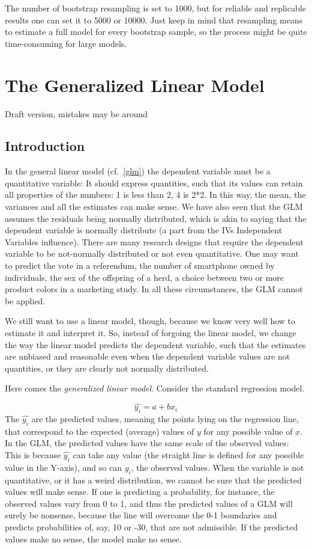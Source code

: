 \documentclass[
]{book}
\begin{document}
The number of bootstrap resampling is set to 1000, but for reliable and replicable results one can set it to 5000 or 10000. Just keep in mind that resampling means to estimate a full model for every bootstrap sample, so the process might be quite time-consuming for large models.

\hypertarget{gzlm}{%
\chapter{The Generalized Linear Model}\label{gzlm}}

{ Draft version, mistakes may be around }

\hypertarget{gzlmintro}{%
\section{Introduction}\label{gzlmintro}}

In the general linear model (cf.~\ref{glm}) the dependent variable must be a quantitative variable: It should express quantities, such that its values can retain all properties of the numbers: 1 is less than 2, 4 is 2*2. In this way, the mean, the variances and all the estimates can make sense. We have also seen that the GLM assumes the residuals being normally distributed, which is akin to saying that the dependent variable is normally distribute (a part from the {IVs {Independent Variables} } influence). There are many research designs that require the dependent variable to be not-normally distributed or not even quantitative. One may want to predict the vote in a referendum, the number of smartphone owned by individuals, the sex of the offspring of a herd, a choice between two or more product colors in a marketing study. In all these circumstances, the GLM cannot be applied.

We still want to use a linear model, though, because we know very well how to estimate it and interpret it. So, instead of forgoing the linear model, we change the way the linear model predicts the dependent variable, such that the estimates are unbiased and reasonable even when the dependent variable values are not quantities, or they are clearly not normally distributed.

Here comes the \emph{generalized linear model}. Consider the standard regression model.

\[
\hat{y_i}=a+b x_i
\]
The \(\hat{y_i}\) are the predicted values, meaning the points lying on the regression line, that correspond to the expected (average) values of \(y\) for any possible value of \(x\). In the GLM, the predicted values have the same scale of the observed values: This is because \(\hat{y_i}\) can take any value (the straight line is defined for any possible value in the Y-axis), and so can \(y_i\), the observed values. When the variable is not quantitative, or it has a weird distribution, we cannot be sure that the predicted values will make sense. If one is predicting a probability, for instance, the observed values vary from 0 to 1, and thus the predicted values of a GLM will surely be nonsense, because the line will overcome the 0-1 boundaries and predicts probabilities of, say, 10 or -30, that are not admissible. If the predicted values make no sense, the model make no sense.
\end{document}
